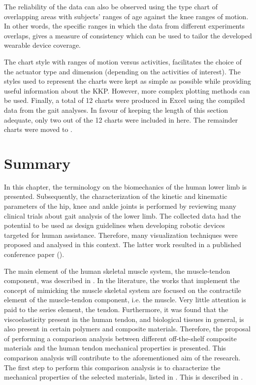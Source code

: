 The reliability of the data can also be observed using the type chart of overlapping areas with subjects' ranges of age against the knee ranges of motion. In other words, the specific ranges in which the data from different experiments overlaps, gives a measure of consistency which can be used to tailor the developed wearable device coverage. 

The chart style with ranges of motion versus activities, facilitates the choice of the actuator type and dimension (depending on the activities of interest). The styles used to represent the charts were kept as simple as possible while providing useful information about the KKP. However, more complex plotting methods can be used. Finally, a total of 12 charts were produced in Excel\textregistered{} using the compiled data from the gait analyses. In favour of keeping the length of this section adequate, only two out of the 12 charts were included in here. The remainder charts were moved to .

\section{Summary}

In this chapter, the terminology on the biomechanics of the human lower limb is presented. Subsequently, the characterization of the kinetic and kinematic parameters of the hip, knee and ankle joints is performed by reviewing many clinical trials about gait analysis of the lower limb. The collected data had the potential to be used as design guidelines when developing robotic devices targeted for human assistance. Therefore, many visualization techniques were proposed and analysed in this context. The latter work resulted in a published conference paper (). 

The main element of the human skeletal muscle system, the muscle-tendon component, was described in . In the literature, the works that implement the concept of mimicking the muscle skeletal system are focused on the contractile element of the muscle-tendon component, i.e. the muscle. Very little attention is paid to the series element, the tendon. Furthermore, it was found that the viscoelasticity present in the human tendon, and biological tissues in general, is also present in certain polymers and composite materials. Therefore, the proposal of performing a comparison analysis between different off-the-shelf composite materials and the human tendon mechanical properties is presented. This comparison analysis will contribute to the aforementioned aim of the research. The first step to perform this comparison analysis is to characterize the mechanical properties of the selected materials, listed in . This is described in .


